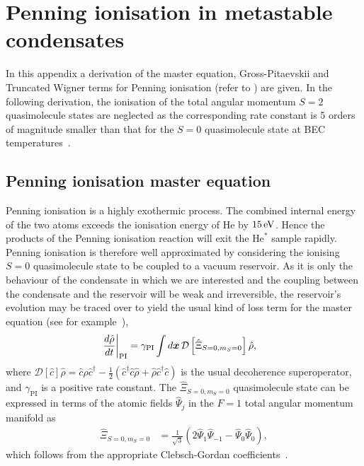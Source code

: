 \chapter{Penning ionisation in metastable condensates}
\label{PenningIonisationAppendix}
\graphicspath{{Figures/PenningIonisationAppendix/}{Figures/Common/}}

In this appendix a derivation of the master equation, Gross-Pitaevskii and Truncated Wigner terms for Penning ionisation (refer to ) are given. In the following derivation, the ionisation of the total angular momentum $S=2$ quasimolecule states are neglected as the corresponding rate constant is 5 orders of magnitude smaller than that for the $S=0$ quasimolecule state at BEC temperatures~\citep{Shlyapnikov:1994}.

\section{Penning ionisation master equation}
\label{PenningIonisationAppendix:MasterEquation}

Penning ionisation is a highly exothermic process. The combined internal energy of the two atoms exceeds the ionisation energy of $\text{He}$ by $\unit[15]{eV}$. Hence the products of the Penning ionisation reaction will exit the $\text{He}^*$ sample rapidly. Penning ionisation is therefore well approximated by considering the ionising $S=0$ quasimolecule state to be coupled to a vacuum reservoir. As it is only the behaviour of the condensate in which we are interested and the coupling between the condensate and the reservoir will be weak and irreversible, the reservoir's evolution may be traced over to yield the usual kind of loss term for the master equation (see for example~\citep[Chapter 8]{Scully}),
\begin{align}
    \label{PenningIonisationAppendix:MasterEquationTermArbitraryConstant}
    \left.\frac{d \hat{\rho}}{d t}\right|_\text{PI} &= \gamma_\text{PI} \int d \vect{x}\, \mathcal{D}\left[ \hat{\Xi}_{S=0, m_S=0}\right] \hat{\rho},
\end{align}
where $\mathcal{D}[\hat{c}]\hat{\rho} = \hat{c}\hat{\rho}\hat{c}^\dagger - \frac{1}{2}(\hat{c}^\dagger \hat{c} \hat{\rho} + \hat{\rho}\hat{c}^\dagger \hat{c})$ is the usual decoherence superoperator, and $\gamma_\text{PI}$ is a positive rate constant. The $\hat{\Xi}_{S=0, m_S=0}$ quasimolecule state can be expressed in terms of the atomic fields $\hat{\Psi}_j$ in the $F=1$ total angular momentum manifold as
\begin{align}
    \hat{\Xi}_{S=0, m_S=0} &= \frac{1}{\sqrt{3}} \left( 2 \hat{\Psi}_1 \hat{\Psi}_{-1} - \hat{\Psi}_0 \hat{\Psi}_0\right),
    \label{PenningIonisationAppendix:S0Quasimolecule}
\end{align}
which follows from the appropriate Clebsch-Gordan coefficients~\citep{Ho:1998}.

